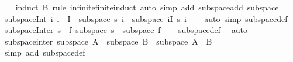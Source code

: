 \begin{isabellebody}
%
\isadelimproof
\ \ %
\endisadelimproof
%
\isatagproof
{}\isamarkupfalse%
\ {\isacharparenleft}{\kern0pt}induct\ B\ rule{\isacharcolon}{\kern0pt}\ infinite{\isacharunderscore}{\kern0pt}finite{\isacharunderscore}{\kern0pt}induct{\isacharparenright}{\kern0pt}\ {\isacharparenleft}{\kern0pt}auto\ simp\ add{\isacharcolon}{\kern0pt}\ subspace{\isacharunderscore}{\kern0pt}add\ subspace{\isacharunderscore}{\kern0pt}{}{\isacharparenright}{\kern0pt}%
\endisatagproof
{\isafoldproof}%
%
\isadelimproof
\isanewline
%
\endisadelimproof
\isanewline
{}\isamarkupfalse%
\ subspace{\isacharunderscore}{\kern0pt}Int{\isacharcolon}{\kern0pt}\ {\isachardoublequoteopen}{\isacharparenleft}{\kern0pt}{\isasymAnd}i{\isachardot}{\kern0pt}\ i\ {\isasymin}\ I\ {\isasymLongrightarrow}\ subspace\ {\isacharparenleft}{\kern0pt}s\ i{\isacharparenright}{\kern0pt}{\isacharparenright}{\kern0pt}\ {\isasymLongrightarrow}\ subspace\ {\isacharparenleft}{\kern0pt}{\isasymInter}i{\isasymin}I{\isachardot}{\kern0pt}\ s\ i{\isacharparenright}{\kern0pt}{\isachardoublequoteclose}\isanewline
%
\isadelimproof
\ \ %
\endisadelimproof
%
\isatagproof
{}\isamarkupfalse%
\ {\isacharparenleft}{\kern0pt}auto\ simp{\isacharcolon}{\kern0pt}\ subspace{\isacharunderscore}{\kern0pt}def{\isacharparenright}{\kern0pt}%
\endisatagproof
{\isafoldproof}%
%
\isadelimproof
\isanewline
%
\endisadelimproof
\isanewline
{}\isamarkupfalse%
\ subspace{\isacharunderscore}{\kern0pt}Inter{\isacharcolon}{\kern0pt}\ {\isachardoublequoteopen}{\isasymforall}s\ {\isasymin}\ f{\isachardot}{\kern0pt}\ subspace\ s\ {\isasymLongrightarrow}\ subspace\ {\isacharparenleft}{\kern0pt}{\isasymInter}f{\isacharparenright}{\kern0pt}{\isachardoublequoteclose}\isanewline
%
\isadelimproof
\ \ %
\endisadelimproof
%
\isatagproof
{}\isamarkupfalse%
\ subspace{\isacharunderscore}{\kern0pt}def\ \isamarkupfalse%
\ auto%
\endisatagproof
{\isafoldproof}%
%
\isadelimproof
\isanewline
%
\endisadelimproof
\isanewline
{}\isamarkupfalse%
\ subspace{\isacharunderscore}{\kern0pt}inter{\isacharcolon}{\kern0pt}\ {\isachardoublequoteopen}subspace\ A\ {\isasymLongrightarrow}\ subspace\ B\ {\isasymLongrightarrow}\ subspace\ {\isacharparenleft}{\kern0pt}A\ {\isasyminter}\ B{\isacharparenright}{\kern0pt}{\isachardoublequoteclose}\isanewline
%
\isadelimproof
\ \ %
\endisadelimproof
%
\isatagproof
{}\isamarkupfalse%
\ {\isacharparenleft}{\kern0pt}simp\ add{\isacharcolon}{\kern0pt}\ subspace{\isacharunderscore}{\kern0pt}def{\isacharparenright}{\kern0pt}%

\end{isabellebody}
